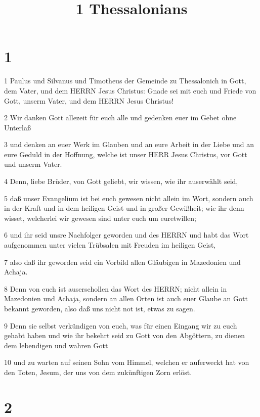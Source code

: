 

\title{1 Thessalonians}


\chapter{1}

\par 1 Paulus und Silvanus und Timotheus der Gemeinde zu Thessalonich in Gott, dem Vater, und dem HERRN Jesus Christus: Gnade sei mit euch und Friede von Gott, unserm Vater, und dem HERRN Jesus Christus!
\par 2 Wir danken Gott allezeit für euch alle und gedenken euer im Gebet ohne Unterlaß
\par 3 und denken an euer Werk im Glauben und an eure Arbeit in der Liebe und an eure Geduld in der Hoffnung, welche ist unser HERR Jesus Christus, vor Gott und unserm Vater.
\par 4 Denn, liebe Brüder, von Gott geliebt, wir wissen, wie ihr auserwählt seid,
\par 5 daß unser Evangelium ist bei euch gewesen nicht allein im Wort, sondern auch in der Kraft und in dem heiligen Geist und in großer Gewißheit; wie ihr denn wisset, welcherlei wir gewesen sind unter euch um euretwillen;
\par 6 und ihr seid unsre Nachfolger geworden und des HERRN und habt das Wort aufgenommen unter vielen Trübsalen mit Freuden im heiligen Geist,
\par 7 also daß ihr geworden seid ein Vorbild allen Gläubigen in Mazedonien und Achaja.
\par 8 Denn von euch ist auserschollen das Wort des HERRN; nicht allein in Mazedonien und Achaja, sondern an allen Orten ist auch euer Glaube an Gott bekannt geworden, also daß uns nicht not ist, etwas zu sagen.
\par 9 Denn sie selbst verkündigen von euch, was für einen Eingang wir zu euch gehabt haben und wie ihr bekehrt seid zu Gott von den Abgöttern, zu dienen dem lebendigen und wahren Gott
\par 10 und zu warten auf seinen Sohn vom Himmel, welchen er auferweckt hat von den Toten, Jesum, der uns von dem zukünftigen Zorn erlöst.

\chapter{2}

